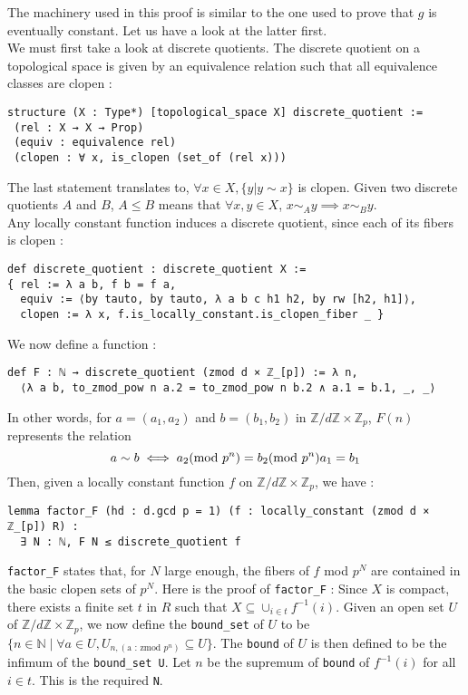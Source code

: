 \documentclass[a4paper,UKenglish,cleveref, autoref, thm-restate]{lipics-v2021}
\newcommand{\lean}[1]{\texttt{#1}\xspace} %
\begin{document}
The machinery used in this proof is similar to the one used to prove that $g$ is eventually constant. Let us have a look at the latter first. \\

We must first take a look at discrete quotients. The discrete quotient on a topological space is given by an equivalence relation such 
that all equivalence classes are clopen : 
\begin{lstlisting}
structure (X : Type*) [topological_space X] discrete_quotient :=
 (rel : X → X → Prop)
 (equiv : equivalence rel)
 (clopen : ∀ x, is_clopen (set_of (rel x)))
\end{lstlisting}

The last statement translates to, $\forall x \in X, \{ y | y \sim x \}$ is clopen. 
Given two discrete quotients $A$ and $B$, $A \le B$ means that $\forall x,y \in X$, 
$x \sim_{A} y \implies x \sim_{B} y$. \\

Any locally constant function induces a discrete quotient, since each of its fibers is clopen : 
\begin{lstlisting}
def discrete_quotient : discrete_quotient X :=
{ rel := λ a b, f b = f a,
  equiv := ⟨by tauto, by tauto, λ a b c h1 h2, by rw [h2, h1]⟩,
  clopen := λ x, f.is_locally_constant.is_clopen_fiber _ }
\end{lstlisting}

We now define a function : 
\begin{lstlisting}
def F : ℕ → discrete_quotient (zmod d × ℤ_[p]) := λ n, 
  ⟨λ a b, to_zmod_pow n a.2 = to_zmod_pow n b.2 ∧ a.1 = b.1, _, _⟩
\end{lstlisting}

In other words, for $a = (a_1, a_2)$ and $b = (b_1, b_2)$ in $\mathbb{Z}/d \mathbb{Z} \times \mathbb{Z}_p$, $F(n)$ represents the relation 
$$ a \sim b \iff a_2 (\text{mod } p^n) = b_2 (\text{mod } p^n) \and a_1 = b_1 $$
Then, given a locally constant function $f$ on $\mathbb{Z}/d \mathbb{Z} \times \mathbb{Z}_p$, we have :
\begin{lstlisting}
lemma factor_F (hd : d.gcd p = 1) (f : locally_constant (zmod d × ℤ_[p]) R) :
  ∃ N : ℕ, F N ≤ discrete_quotient f
\end{lstlisting}

\lean{factor\_F} states that, for $N$ large enough, the fibers of $f$ mod $p^N$ are contained in the basic clopen sets of $p^N$. 
Here is the proof of \lean{factor\_F} : Since $X$ is compact, there exists a finite set $t$ in $R$ such that $X \subseteq \cup_{i \in t} f^{-1} (i)$. 
Given an open set $U$ of $\mathbb{Z}/d \mathbb{Z} \times \mathbb{Z}_p$, we now define the \lean{bound\_set} of $U$ to be 
\newline $\{ n \in \mathbb{N} \mid \forall a \in U, U_{n, (\text{a : zmod }p^n)} \subseteq U \}$. The \lean{bound} of $U$ is then defined to be the infimum of the \lean{bound\_set U}. 
Let $n$ be the supremum of \lean{bound} of $f^{-1} (i)$ for all $i \in t$. This is the required \lean{N}. \\
\end{document}
